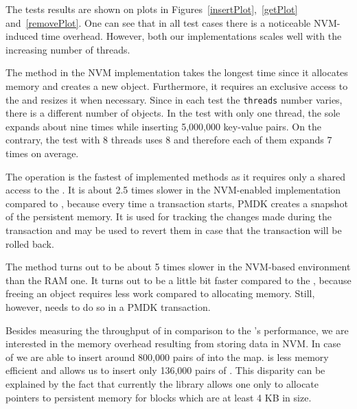    The tests results are shown on plots in Figures~\ref{insertPlot},~\ref{getPlot} and~\ref{removePlot}. One can see that in all test cases there is a noticeable NVM-induced time overhead. However, both our implementations scales well with the increasing number of threads.
    
    The \insertMethod method in the NVM implementation takes the longest time since it allocates memory and creates a new object. Furthermore, it requires an exclusive access to the \internalHashMap and resizes it when necessary. Since in each test the \texttt{threads} number varies, there is a different number of \internalHashMap objects. In the test with only one thread, the sole \internalHashMap expands about nine times while inserting 5,000,000 key-value pairs. On the contrary, the test with 8 threads uses 8 \internalHashMaps and therefore each of them expands 7 times on average. 
    
    The \getMethod operation is the fastest of implemented methods as it requires only a shared access to the \internalHashMap. It is about 2.5 times slower in the NVM-enabled implementation compared to \StandardHashMap, because  every time a transaction starts, PMDK creates a snapshot of the persistent memory.
    It is used for tracking the changes made during the transaction and may be used to revert them in case that the transaction will be rolled back.
    
    The \removeMethod method turns out to be about 5 times slower in the NVM-based environment than the RAM one. It turns out to be a little bit faster compared to the \insertMethod, because freeing an object requires less work compared to allocating memory. Still, however, \removeMethod needs to do so in a PMDK transaction. 
    
    Besides measuring the throughput of \PHT in comparison to the \StandardHashMap's performance, we are interested in the memory overhead resulting from storing data in NVM.  In case of \StandardHashMap we are able to insert around 800,000 pairs  of \integersMap into the map. \PHT is less memory efficient and allows us to insert only 136,000 pairs of \integersMap. This disparity can be explained by the fact that currently the \libpmemobjcpp library allows one only to allocate pointers to persistent memory for blocks which are at least 4 KB in size.
    
